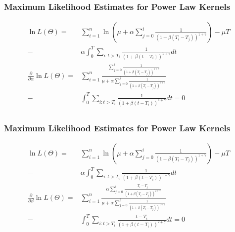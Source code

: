 \documentclass{beamer}
\begin{document}
\begin{frame}
\frametitle{Maximum Likelihood Estimates for Power Law Kernels}
\begin{equation*}
\begin{split}
\ln L(\Theta) = &\sum_{i=1}^n \ln(\mu + \alpha\sum_{j=0}^i \frac{1}{(1 + \beta (T_i - T_j))^{1 + \gamma}}) - \mu T\\
- &\alpha \int_{0}^{T} \sum_{i: t>T_i} \frac{1}{(1 + \beta (t - T_i))^{1 + \gamma}} dt\\[7mm]
\frac{\partial}{\partial \alpha} \ln L(\Theta) = &\sum_{i=1}^n \frac{\sum_{j=0}^i \frac{1}{(1 + \beta (T_i - T_j))^{1 + \gamma}}}{\mu + \alpha\sum_{j=0}^i \frac{1}{(1 + \beta (T_i - T_j))^{1 + \gamma}}}\\
- &\int_{0}^{T} \sum_{i: t>T_i} \frac{1}{(1 + \beta (t - T_i))^{1 + \gamma}} dt = 0\\
\end{split}
\end{equation*}
\end{frame}

\begin{frame}
\frametitle{Maximum Likelihood Estimates for Power Law Kernels}
\begin{equation*}
\begin{split}
\ln L(\Theta) = &\sum_{i=1}^n \ln(\mu + \alpha\sum_{j=0}^i \frac{1}{(1 + \beta (T_i - T_j))^{1 + \gamma}}) - \mu T\\
- &\alpha \int_{0}^{T} \sum_{i: t>T_i} \frac{1}{(1 + \beta (t - T_i))^{1 + \gamma}} dt\\[7mm]
\frac{\partial}{\partial \beta} \ln L(\Theta) = &\sum_{i=1}^n \frac{\alpha\sum_{j=0}^i \frac{T_i - T_j}{(1 + \beta (T_i - T_j))^{2 + \gamma}}}{\mu + \alpha\sum_{j=0}^i \frac{1}{(1 + \beta (T_i - T_j))^{1 + \gamma}}}\\
- &\int_{0}^{T} \sum_{i: t>T_i} \frac{t - T_i}{(1 + \beta (t - T_i))^{2 + \gamma}} dt = 0\\
\end{split}
\end{equation*}
\end{frame}
\end{document}
